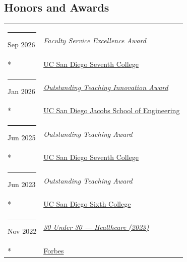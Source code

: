 \documentclass[margin,line]{res}
\begin{document}
\begin{resume}
\section{\sc Honors and Awards}
\begin{longtable}{@{}p{0.7in}p{4in}}
\hspace*{-4mm} \rule{-1mm}{5mm} Sep 2026 & \textit{Faculty Service Excellence Award}\\*
\hspace*{-4mm} \hspace*{-4mm} & \hspace{4mm} \href{https://seventh.ucsd.edu/}{UC San Diego Seventh College}\\
\hspace*{-4mm} \rule{-1mm}{5mm} Jan 2026 & \href{https://today.ucsd.edu/story/automated-grading-system-earns-inaugural-outstanding-teaching-innovation-award}{\textit{Outstanding Teaching Innovation Award}}\\*
\hspace*{-4mm} \hspace*{-4mm} & \hspace{4mm} \href{https://jacobsschool.ucsd.edu/}{UC San Diego Jacobs School of Engineering}\\
\hspace*{-4mm} \rule{-1mm}{5mm} Jun 2025 & \textit{Outstanding Teaching Award}\\*
\hspace*{-4mm} \hspace*{-4mm} & \hspace{4mm} \href{https://seventh.ucsd.edu/}{UC San Diego Seventh College}\\
\hspace*{-4mm} \rule{-1mm}{5mm} Jun 2023 & \textit{Outstanding Teaching Award}\\*
\hspace*{-4mm} \hspace*{-4mm} & \hspace{4mm} \href{https://sixth.ucsd.edu/}{UC San Diego Sixth College}\\
\hspace*{-4mm} \rule{-1mm}{5mm} Nov 2022 & \href{https://www.forbes.com/profile/niema-moshiri}{\textit{30 Under 30 --- Healthcare (2023)}}\\*
\hspace*{-4mm} \hspace*{-4mm} & \hspace{4mm} \href{https://www.forbes.com/30-under-30/2023/healthcare/}{Forbes}\\

\end{longtable}
\end{resume}
\end{document}
